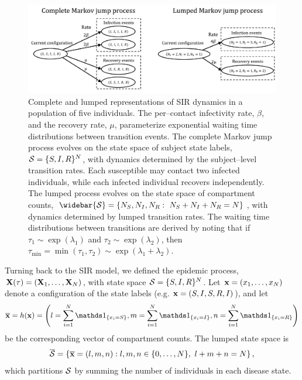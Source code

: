 \begin{figure}
	\centering
	\includegraphics[width=\linewidth]{figures/SIR_representations}
	\caption{Complete and lumped representations of SIR dynamics in a population of five individuals. The per--contact infectivity rate, $ \beta $, and the recovery rate, $ \mu $, parameterize exponential waiting time distributions between transition events. The complete Markov jump process evolves on the state space of subject state labels, $ \mathcal{S} = \lbrace S,I,R\rbrace^N $, with dynamics determined by the subject--level transition rates. Each susceptible may contact two infected individuals, while each infected individual recovers independently. The lumped process evolves on the state space of compartment counts, $ \widebar{\mcS} = \lbrace N_S,N_I,N_R:\ N_S + N_I+N_R=N\rbrace $, with dynamics determined by lumped transition rates. The waiting time distributions between transitions are derived by noting that if $ \tau_1\sim \exp(\lambda_1) $ and $ \tau_2\sim\exp(\lambda_2) $, then $ \tau_{\min} = \min(\tau_1,\tau_2)\sim\exp(\lambda_1+\lambda_2) $.}
	\label{fig:sirrepresentations}
\end{figure}

Turning back to the SIR model, we defined the epidemic process, $ \mathbf{X}(\tau) = (\mathbf{X}_1,\dots,\mathbf{X}_N)$, with state space $ \mathcal{S} = \lbrace S, I, R\rbrace^N $. Let $ \mathbf{x} = (x_1,\dots,x_N) $ denote a configuration of the state labels (e.g. $ \mathbf{x} = (S, I, S, R, I) $), and let $$ \overline{\bx} = h(\bx) = \left (l=\sum_{i=1}^N\ind{x_i = S},m=\sum_{i=1}^N\ind{x_i=I},n = \sum_{i=1}^N\ind{x_i=R}\right ) $$ be the corresponding vector of compartment counts. The lumped state space is 
$$ \overline{\mathcal{S}} = \left \lbrace \overline{\mathbf{x}} = (l,m,n): l,m,n \in \lbrace0,\dots,N\rbrace,\  l+m+n = N \right \rbrace, $$ 
which partitions $ \mathcal{S} $ by summing the number of individuals in each disease state. 

